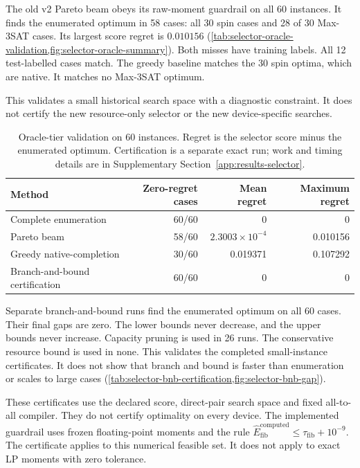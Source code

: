 \documentclass[a4paper,onecolumn,11pt,unpublished]{quantumarticle}
\theoremstyle{remark}
\begin{document}
The old v2 Pareto beam obeys its raw-moment guardrail on all 60 instances.
It finds the enumerated optimum in 58 cases: all 30 spin cases and
28 of 30 Max-3SAT cases. Its largest score regret is $0.010156$
(\cref{tab:selector-oracle-validation,fig:selector-oracle-summary}).
Both misses have training labels. All 12 test-labelled cases match.
The greedy baseline matches the 30 spin optima, which are native.
It matches no Max-3SAT optimum.

This validates a small historical search space with a diagnostic constraint.
It does not certify the new resource-only selector or the new device-specific
searches.

\begin{table}[!htbp]
\centering
\small
\caption{Oracle-tier validation on 60 instances. Regret is the selector
score minus the enumerated optimum. Certification is a separate exact run;
work and timing details are in Supplementary Section~\ref{app:results-selector}.}
\label{tab:selector-oracle-validation}
\begin{tabular}{@{}lrrr@{}}
\toprule
Method & Zero-regret cases & Mean regret & Maximum regret\\
\midrule
Complete enumeration & 60/60 & 0 & 0\\
Pareto beam & 58/60 & $2.3003\times10^{-4}$ & 0.010156\\
Greedy native-completion & 30/60 & 0.019371 & 0.107292\\
Branch-and-bound certification & 60/60 & 0 & 0\\
\bottomrule
\end{tabular}

\end{table}

Separate branch-and-bound runs find the enumerated optimum on all 60 cases.
Their final gaps are zero. The lower bounds never decrease, and the upper
bounds never increase. Capacity pruning is used in 26 runs.
The conservative resource bound is used in none.
This validates the completed small-instance certificates. It does not show
that branch and bound is faster than enumeration or scales to large cases
(\cref{tab:selector-bnb-certification,fig:selector-bnb-gap}).

These certificates use the declared score, direct-pair search space and fixed
all-to-all compiler. They do not certify optimality on every device.
The implemented guardrail uses frozen floating-point moments and the rule
$\widehat E_{\mathrm{fib}}^{\mathrm{computed}}\leq\tau_{\mathrm{fib}}+10^{-9}$.
The certificate applies to this numerical feasible set. It does not apply
to exact LP moments with zero tolerance.
\end{document}
